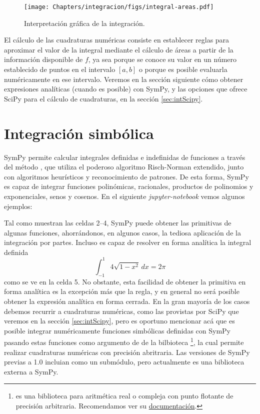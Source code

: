 \begin{figure}[ht]
 \centering
 \texttt{[image: Chapters/integracion/figs/integral-areas.pdf]}
 \caption{Interpretación gráfica de la integración.}
 \label{fig:int-areas}
\end{figure}

El cálculo de las cuadraturas numéricas consiste en establecer reglas para aproximar el valor de la integral mediante el cálculo de áreas a partir de la información disponible de $f$, ya sea porque se conoce su valor en un número establecido de puntos en el intervalo $[a, b]$ o porque es posible evaluarla numéricamente en ese intervalo. Veremos en la sección siguiente cómo obtener expresiones analíticas (cuando es posible) con SymPy, y las opciones que ofrece SciPy para el cálculo de cuadraturas, en la sección \ref{sec:intScipy}.


\section{Integración simbólica}
SymPy permite calcular integrales definidas e indefinidas de funciones a través del método , que utiliza el poderoso algoritmo Risch-Norman extendido, junto con algoritmos heurísticos y reconocimiento de patrones. De esta forma, SymPy es capaz de integrar funciones polinómicas, racionales, productos de polinomios y exponenciales, senos y cosenos. En el siguiente \textit{jupyter-notebook} vemos algunos ejemplos:

Tal como muestran las celdas 2--4, SymPy puede obtener las primitivas de algunas funciones, ahorrándonos, en algunos casos, la tediosa aplicación de la integración por partes. Incluso es capaz de resolver en forma analítica la integral definida
\begin{equation} \label{eq:int01}
\int_{-1}^{1}{4 \sqrt{1 - x^2} \, dx} = 2 \pi 
\end{equation} 
como se ve en la celda 5. No obstante, esta facilidad de obtener la primitiva en forma analítica es la excepción más que la regla, y en general no será posible obtener la expresión analítica en forma cerrada. En la gran mayoría de los casos debemos recurrir a cuadraturas numéricas, como las provistas por SciPy que veremos en la sección \ref{sec:intScipy}, pero es oportuno mencionar acá que es posible integrar numéricamente funciones simbólicas definidas con SymPy pasando estas funciones como argumento de  de la bilbioteca \footnote{ es una biblioteca para aritmética real o compleja con punto flotante de precisión arbitraria. Recomendamos ver su \href{https://mpmath.org/}{documentación}.}, la cual permite realizar cuadraturas numéricas con precisión abritraria. Las versiones de SymPy previas a 1.0 incluian  como un submódulo, pero actualmente es una biblioteca externa a SymPy.

